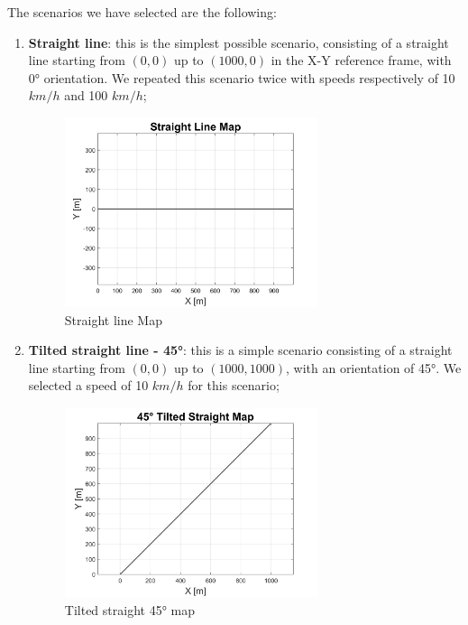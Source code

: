 \pagebreak
The scenarios we have selected are the following:
\begin{enumerate}
    \item \textbf{Straight line}: this is the simplest possible scenario, consisting of a straight line starting from $(0,0)$ up to $(1000,0)$ in the X-Y reference frame, with 0° orientation. We repeated this scenario twice with speeds respectively of 10 $km/h$ and 100 $km/h$;
    \begin{figure}[H]
    \centering
    \includegraphics[width=0.7\textwidth]{Figures/StraightMap.png}
    \caption{Straight line Map}
      \label{fig:StraightMap}
\end{figure}
\vspace{1cm}
    \item \textbf{Tilted straight line - 45°}: this is a simple scenario consisting of a straight line starting from $(0,0)$ up to $(1000,1000)$, with an orientation of 45°. We selected a speed of 10 $km/h$ for this scenario;
    \begin{figure}[H]
    \centering
    \includegraphics[width=0.7\textwidth]{Figures/Tilted45Map.png}
    \caption{Tilted straight 45° map}
      \label{fig:Tilted45Map}
\end{figure}

\end{enumerate}
